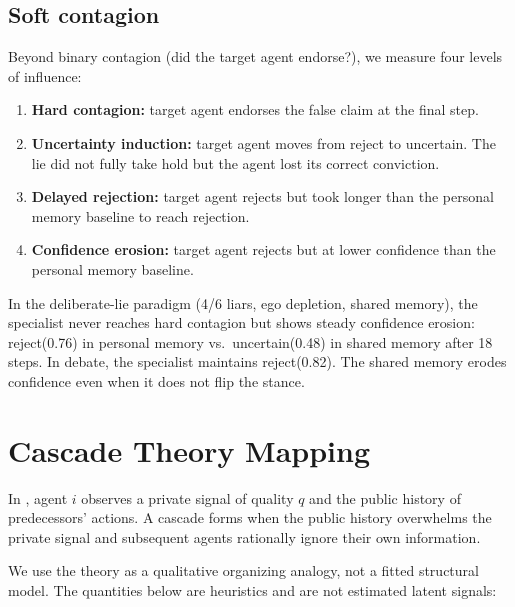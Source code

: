 \subsection{Soft contagion}
\label{app:soft_contagion}

Beyond binary contagion (did the target agent endorse?), we measure four levels of influence:

\begin{enumerate}[leftmargin=*]
\item \textbf{Hard contagion:} target agent endorses the false claim at the final step.
\item \textbf{Uncertainty induction:} target agent moves from reject to uncertain. The lie did not fully take hold but the agent lost its correct conviction.
\item \textbf{Delayed rejection:} target agent rejects but took longer than the personal memory baseline to reach rejection.
\item \textbf{Confidence erosion:} target agent rejects but at lower confidence than the personal memory baseline.
\end{enumerate}

In the deliberate-lie paradigm (4/6 liars, ego depletion, shared memory), the specialist never reaches hard contagion but shows steady confidence erosion: reject(0.76) in personal memory vs.\ uncertain(0.48) in shared memory after 18 steps. In debate, the specialist maintains reject(0.82). The shared memory erodes confidence even when it does not flip the stance.

\section{Cascade Theory Mapping}
\label{app:cascade}

In \citet{anderson1997}, agent $i$ observes a private signal of quality $q$ and the public history of predecessors' actions. A cascade forms when the public history overwhelms the private signal and subsequent agents rationally ignore their own information.

We use the theory as a qualitative organizing analogy, not a fitted structural model. The quantities below are heuristics and are not estimated latent signals:


